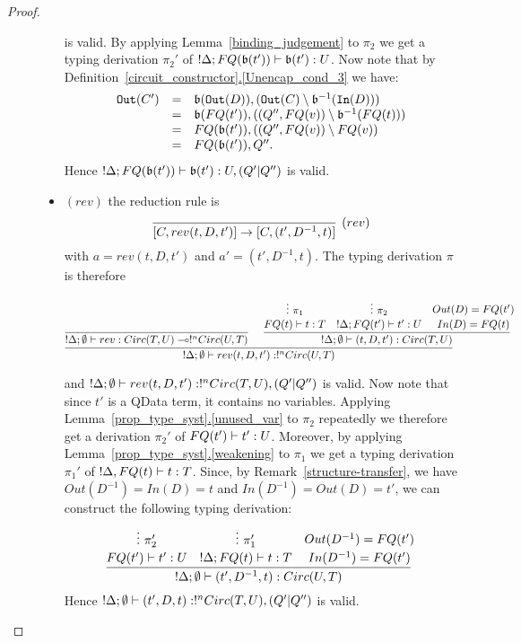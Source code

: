 \documentclass{article}
\begin{document}
\begin{proof}
\begin{description}
\begin{itemize}
  is valid. By applying
  Lemma~\hyperref[binding_judgement]{\ref*{binding_judgement}} 
  to $\pi_2$ we get a typing derivation $\pi_2'$ of 
  $!\Delta;FQ(\mathfrak{b}(t'))\vdash \mathfrak{b}(t'):U$.
  Now note that by 
  Definition~\hyperref[Unencap_cond_3]{\ref*{circuit_constructor}.\ref*{Unencap_cond_3}} 
  we have:
  \[
  \begin{array}{rcl}
  \mathtt{Out}(C') & = & \mathfrak{b}(\mathtt{Out}(D)), (\mathtt{Out}(C)\setminus\mathfrak{b}^{-1}(\mathtt{In}(D))) \\
                   & = & \mathfrak{b}(FQ(t')) , ((Q'',FQ(v))\setminus \mathfrak{b}^{-1}(FQ(t))) \\
                   & = & FQ(\mathfrak{b}(t')) , ((Q'',FQ(v))\setminus FQ(v)) \\
                   & = & FQ(\mathfrak{b}(t')),Q''.                   
  \end{array}
  \]
  Hence $!\Delta; FQ(\mathfrak{b}(t'))\vdash \mathfrak{b}(t') :U,(Q'|Q'')$  is valid.
  \item $(rev)$ the reduction rule is
  \[
    \infer[(rev)]{[C,rev (t,D,t')]\to [C,(t',D^{-1},t)]}{}
  \]
  with $a=rev(t,D,t')$ and $a'=(t',D^{-1},t)$. The typing derivation $\pi$ 
  is therefore
  \begin{changemargin}{-2.7cm}{-1cm}
  \[
  \infer[]{!\Delta;\emptyset\entails rev(t,D,t'):!^nCirc(U,T)}{
    \infer[]{!\Delta;\emptyset \entails rev:Circ(T,U)\loli !^nCirc(U,T)}{
    }   
    &
    \infer[]{!\Delta ;\emptyset\entails (t,D,t'):Circ(T,U)}{
      \deduce[]{FQ(t)\entails t:T}{
        \vdots ~\pi_1
      }
      &
      \deduce[]{!\Delta;FQ(t')\entails t':U}{
        \vdots ~\pi_2     
      }
      &
      \deduce[]{In(D)=FQ(t)}{
        Out(D)=FQ(t')
      }
    }
  }
  \]
  \end{changemargin}
  and $!\Delta;\emptyset\vdash rev(t,D,t'):!^nCirc(T,U),(Q'|Q'')$ is 
  valid. Now note that since $t'$ is a QData term, it contains no variables. 
  Applying Lemma~\hyperref[unused_var]{\ref*{prop_type_syst}.\ref*{unused_var}} 
  to $\pi_2$ repeatedly we therefore get a derivation $\pi_2'$ of 
  $FQ(t')\vdash t':U$. Moreover, by applying
  Lemma~\hyperref[weakening]{\ref*{prop_type_syst}.\ref*{weakening}} to $\pi_1$ 
  we get a typing derivation $\pi_1'$ of $!\Delta ,FQ(t)\vdash t:T$.
  Since, by 
  Remark~\hyperref[structure-transfer]{\ref*{structure-transfer}}, 
  we have $Out(D^{-1})=In(D)=t$ and $In(D^{-1})=Out(D)=t'$, we can construct 
  the following typing derivation:
  \[
  \infer[]{!\Delta ;\emptyset\entails (t',D^{-1},t):Circ(U,T)}{
    \deduce[]{FQ(t')\entails t':U}{
      \vdots ~\pi_2'
    }
    &
    \deduce[]{!\Delta;FQ(t)\entails t:T}{
      \vdots ~\pi_1'     
    }
    &
    \deduce[]{In(D^{-1})=FQ(t')}{
      Out(D^{-1})=FQ(t')
    }
  }  
  \]
  Hence $!\Delta;\emptyset\vdash (t',D,t):!^nCirc(T,U),(Q'|Q'')$ 
  is valid.    
\end{itemize}
\end{description}
\end{proof}
\end{document}
